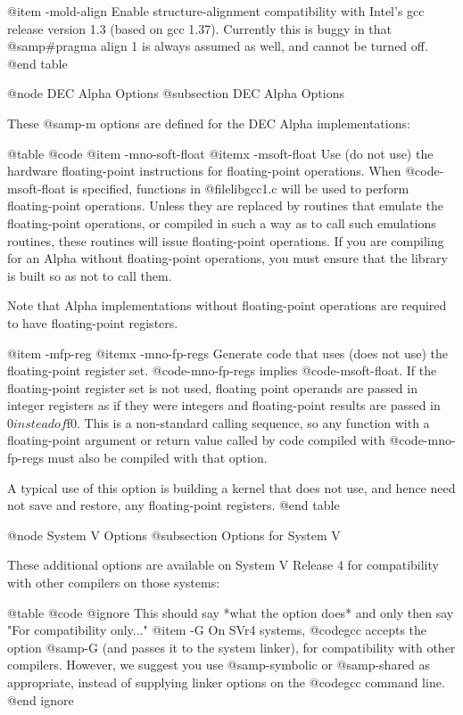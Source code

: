 {{@item -mold-align
Enable structure-alignment compatibility with Intel's gcc release version
1.3 (based on gcc 1.37).  Currently this is buggy in that @samp{#pragma
align 1} is always assumed as well, and cannot be turned off.
@end table

@node DEC Alpha Options
@subsection DEC Alpha Options

These @samp{-m} options are defined for the DEC Alpha implementations:

@table @code
@item -mno-soft-float
@itemx -msoft-float
Use (do not use) the hardware floating-point instructions for
floating-point operations.  When @code{-msoft-float} is specified,
functions in @file{libgcc1.c} will be used to perform floating-point
operations.  Unless they are replaced by routines that emulate the
floating-point operations, or compiled in such a way as to call such
emulations routines, these routines will issue floating-point
operations.   If you are compiling for an Alpha without floating-point
operations, you must ensure that the library is built so as not to call
them.

Note that Alpha implementations without floating-point operations are
required to have floating-point registers.

@item -mfp-reg
@itemx -mno-fp-regs
Generate code that uses (does not use) the floating-point register set.
@code{-mno-fp-regs} implies @code{-msoft-float}.  If the floating-point
register set is not used, floating point operands are passed in integer
registers as if they were integers and floating-point results are passed
in $0 instead of $f0.  This is a non-standard calling sequence, so any
function with a floating-point argument or return value called by code
compiled with @code{-mno-fp-regs} must also be compiled with that
option.

A typical use of this option is building a kernel that does not use,
and hence need not save and restore, any floating-point registers.
@end table

@node System V Options
@subsection Options for System V

These additional options are available on System V Release 4 for
compatibility with other compilers on those systems:

@table @code
@ignore
This should say *what the option does* and only then say
"For compatibility only..."
@item -G
On SVr4 systems, @code{gcc} accepts the option @samp{-G} (and passes
it to the system linker), for compatibility with other compilers.
However, we suggest you use @samp{-symbolic} or @samp{-shared} as
appropriate, instead of supplying linker options on the @code{gcc}
command line.
@end ignore

}}
